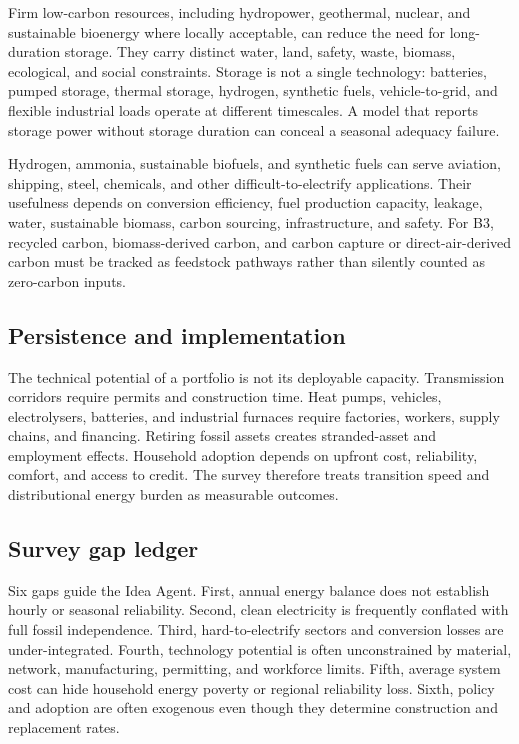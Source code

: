 \documentclass[conference]{IEEEtran}
\begin{document}
Firm low-carbon resources, including hydropower, geothermal, nuclear, and sustainable bioenergy where locally acceptable, can reduce the need for long-duration storage. They carry distinct water, land, safety, waste, biomass, ecological, and social constraints. Storage is not a single technology: batteries, pumped storage, thermal storage, hydrogen, synthetic fuels, vehicle-to-grid, and flexible industrial loads operate at different timescales. A model that reports storage power without storage duration can conceal a seasonal adequacy failure.

Hydrogen, ammonia, sustainable biofuels, and synthetic fuels can serve aviation, shipping, steel, chemicals, and other difficult-to-electrify applications. Their usefulness depends on conversion efficiency, fuel production capacity, leakage, water, sustainable biomass, carbon sourcing, infrastructure, and safety. For B3, recycled carbon, biomass-derived carbon, and carbon capture or direct-air-derived carbon must be tracked as feedstock pathways rather than silently counted as zero-carbon inputs.

\subsection{Persistence and implementation}
The technical potential of a portfolio is not its deployable capacity. Transmission corridors require permits and construction time. Heat pumps, vehicles, electrolysers, batteries, and industrial furnaces require factories, workers, supply chains, and financing. Retiring fossil assets creates stranded-asset and employment effects. Household adoption depends on upfront cost, reliability, comfort, and access to credit. The survey therefore treats transition speed and distributional energy burden as measurable outcomes.

\subsection{Survey gap ledger}
Six gaps guide the Idea Agent. First, annual energy balance does not establish hourly or seasonal reliability. Second, clean electricity is frequently conflated with full fossil independence. Third, hard-to-electrify sectors and conversion losses are under-integrated. Fourth, technology potential is often unconstrained by material, network, manufacturing, permitting, and workforce limits. Fifth, average system cost can hide household energy poverty or regional reliability loss. Sixth, policy and adoption are often exogenous even though they determine construction and replacement rates.
\end{document}

